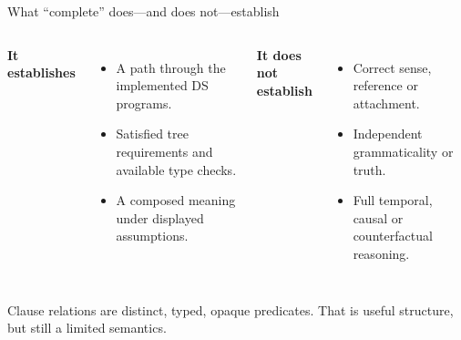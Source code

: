 \documentclass[aspectratio=169,11pt]{beamer}
\newcommand{\keypoint}[1]{\begin{block}{}#1\end{block}}
\begin{document}
\begin{frame}{What “complete” does—and does not—establish}
  \color{Ink}
  \begin{columns}[T,onlytextwidth]
      \textbf{It establishes}\medskip
      \begin{itemize}\setlength\itemsep{8pt}
        \item A path through the implemented DS programs.
        \item Satisfied tree requirements and available type checks.
        \item A composed meaning under displayed assumptions.
      \end{itemize}
      \textbf{It does not establish}\medskip
      \begin{itemize}\setlength\itemsep{8pt}
        \item Correct sense, reference or attachment.
        \item Independent grammaticality or truth.
        \item Full temporal, causal or counterfactual reasoning.
      \end{itemize}
  \end{columns}
  \vspace{4mm}
  \keypoint{Clause relations are distinct, typed, opaque predicates. That is useful structure, but still a limited semantics.}
\end{frame}
\end{document}

